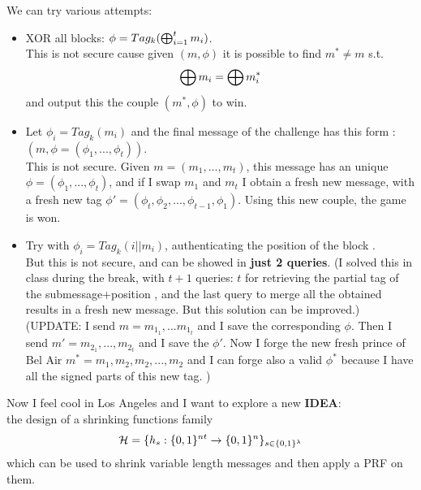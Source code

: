 We can try various attempts:
\begin{itemize}
    
    
    
    \item \label{xorall}XOR all blocks: $\phi=Tag_{k}(\bigoplus_{i=1}^{t}m_{i})$.\\
        This is not secure cause given $(m, \phi)$ it is possible to find
       $m^{*}\not= m$ s.t.
       \[
\bigoplus m_{i} = \bigoplus m_{i}^{*}
        \]
        and output this the couple $(m^{*}, \phi)$ to win.

    


    \item Let $\phi_{i}=Tag_{k}(m_{i})$ and the final message of the challenge
        has this form : $(m, \phi=(\phi_{1}, ..., \phi_{t}))$.\\
        This is not secure. Given $m=(m_{1}, ..., m_{t})$, this message has an
        unique $\phi=(\phi_{1}, ..., \phi_{t})$, and if I swap $m_{1}$ and
        $m_{t}$ I obtain a fresh new message, with a fresh new tag
        $\phi'=(\phi_{t}, \phi_{2}, ..., \phi_{t-1}, \phi_{1})$.
        Using this new couple, the game is won.



    \item Try with $\phi_{i}=Tag_{k}(i||m_{i})$, authenticating the position of
        the block .\\
        But this is not secure, and can be showed in \textbf{just 2 queries}.
        (I solved this in class during the break, with $t+1$ queries: $t$ for
        retrieving the partial tag of the submessage+position , and the last
        query to merge all the obtained results in a fresh new message. But this
        solution can be improved.)
        (UPDATE: I send  $m=m_{1_{1}}, ...m_{1_{t}}$ and I save the
        corresponding $\phi$. Then I send $m'=m_{2_{1}}, ..., m_{2_{t}}$ and I
        save the $\phi'$. Now I forge the new fresh prince of Bel Air
        $m^{*}=m_{1}, m_{2}, m_{2}, ...,m_{2}$
        and I can forge also a valid $\phi^{*}$ because I have all the
        signed parts of this new tag. )
        

\end{itemize}

Now I feel cool in Los Angeles and I want to explore a new \textbf{IDEA}:\\
the design of a shrinking functions family 
\[
   \mathcal{H}= \{ h_{s}:\{0,1\}^{nt} \to \{0,1\}^{n} \}_{s \in \{0,1\}^{\lambda}}
\]
which can be used to shrink variable length messages and then apply a PRF on
them.


